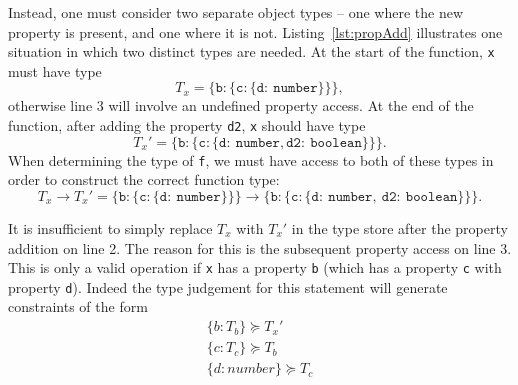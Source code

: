 \documentclass[12pt,a4paper,twoside,openright]{report}
\theoremstyle{definition}
\theoremstyle{dotless}
\newcommand*{\js}{\texttt}
\begin{document}
Instead, one must consider two separate object types -- one where the new
property is present, and one where it is not. Listing~\ref{lst:propAdd}
illustrates one situation in which two distinct types are needed. At the start
of the function, \js{x} must have type 
$$T_x = \mathtt{\{b:\{c:\{d:\ number\}\}\}},$$
otherwise line 3 will involve an undefined property access. At the end of the
function, after adding the property \js{d2}, \js{x} should have type 
$$T_x' = \mathtt{\{b:\{c:\{d:\ number, d2:\ boolean\}\}\}}.$$
When determining the type
of \js{f}, we must have access to both of these types in order to construct the
correct function type: 
$$
  T_x \rightarrow T_x' =
  \mathtt{\{b:\{c:\{d:\ number\}\}\} \rightarrow
  \{b:\{c:\{d:\ number,\ d2:\ boolean\}\}\}}.
$$

It is insufficient to simply replace $T_x$
with $T_x'$ in the type store after the property addition on line 2.  The reason for this
is the subsequent property access on line 3. This is only a valid operation if \js{x} has
a property \js{b} (which has a property \js{c} with property \js{d}). Indeed the
type judgement for this statement will generate constraints of the form 
\begin{equation}
  \begin{split}
 	\label{eq:barC}
 	\{b:T_b\} \succeq T_x' \\
 	\{c:T_c\} \succeq T_b \\
 	\{d:number\} \succeq T_c \\
  \end{split}
\end{equation}
\end{document}
